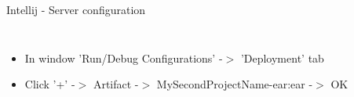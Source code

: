\documentclass[aspectratio=1610,english]{beamer} %
\begin{document}
	\begin{frame}{Intellij - Server configuration}
		
		\begin{columns}
				\begin{minipage}{\textwidth}
				\end{minipage}
				
				\begin{itemize}
					\color{black}
					\tiny
					\item In window 'Run/Debug Configurations' -$>$ 'Deployment' tab
					\item Click '+' -$>$ Artifact -$>$ MySecondProjectName-ear:ear -$>$ OK
				\end{itemize}
				

\end{columns}
\end{frame}
\end{document}
